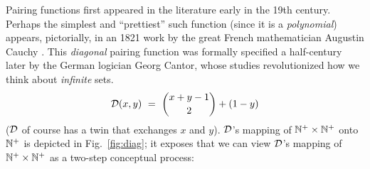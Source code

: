  
Pairing functions first appeared in the literature early in the 19th century.  Perhaps the simplest and ``prettiest'' such function (since it is a {\em polynomial}) appears, pictorially, in an 1821 work by the great French mathematician Augustin Cauchy \cite{Cauchy21}.  This {\em diagonal} pairing function was formally specified a half-century later by the German logician Georg Cantor, whose studies \cite{Cantor74,Cantor78} revolutionized how we think about {\em infinite} sets.
\begin{equation}
\label{eq:diag}
\mbox{$\cal D$}(x, y) \ = \
{{x+y-1} \choose 2} + (1-y)
\end{equation}
($\mbox{$\cal D$}$ of course has a twin that exchanges $x$ and $y$).  $\mbox{$\cal D$}$'s mapping of $\mathbb{N}^+ \times \mathbb{N}^+$ onto $\mathbb{N}^+$ is depicted in Fig.~\ref{fig:diag}; it exposes that we can view $\mbox{$\cal D$}$'s mapping of $\mathbb{N}^+ \times \mathbb{N}^+$ as a two-step conceptual process:

